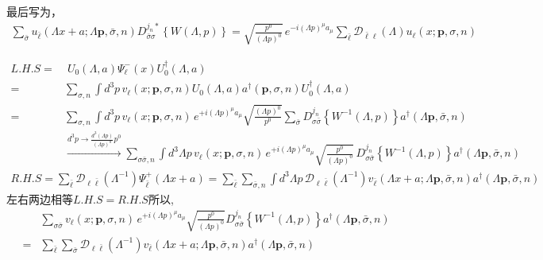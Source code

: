 最后写为，
\begin{equation}
    \begin{aligned}
            \sum_{\bar{\sigma}}u_{\bar{\ell}}(\Lambda x+a;\Lambda \boldsymbol{p},\bar{\sigma},n)D_{\bar{\sigma}\sigma }^{j_n*}\left\{W(\Lambda,p)\right\}=\sqrt{\frac{p^0}{(\Lambda p)^0}}\,e^{-i(\Lambda p)^\mu a_\mu}\sum_{\bar{\ell}}\mathscr{D}_{\bar{\ell}\ell}(\Lambda)u_{\ell}(x;\boldsymbol{p},\sigma,n)
    \end{aligned}
\end{equation}
\centerline{}
\[\begin{aligned}
    L.H.S=&\;U_0(\Lambda,a)\Psi^{-}_\ell(x)U_0^\dagger(\Lambda,a)\\
    =&\sum_{\sigma,n}\int d^3p\, v_{\ell}(x;\boldsymbol{p},\sigma,n) U_0(\Lambda,a)a^\dagger(\boldsymbol{p},\sigma,n)U_0^\dagger(\Lambda,a)\\
    =&\sum_{\sigma,n}\int d^3p\, v_{\ell}(x;\boldsymbol{p},\sigma,n)\,e^{+i(\Lambda p)^\mu a_\mu}\sqrt{\frac{(\Lambda p)^0}{p^0}}\sum_{\bar{\sigma}}D_{\sigma \bar{\sigma}}^{j_n}\left\{W^{-1}(\Lambda,p)\right\}a^\dagger(\Lambda\boldsymbol{p},\bar{\sigma},n)\\
    &\xrightarrow{d^3p\to \frac{d^3(\Lambda p)}{(\Lambda p)^0}p^0}\sum_{\sigma\bar{\sigma},n}\int d^3\Lambda p\, v_{\ell}(x;\boldsymbol{p},\sigma,n)\,e^{+i(\Lambda p)^\mu a_\mu}\sqrt{\frac{p^0}{(\Lambda p)^0}}\,D_{\sigma \bar{\sigma}}^{j_n}\left\{W^{-1}(\Lambda,p)\right\} a^\dagger(\Lambda\boldsymbol{p},\bar{\sigma},n)
\end{aligned}\]
\[\begin{aligned}
    R.H.S=\sum_{\bar{\ell}}\mathscr{D}_{\ell\bar{\ell}}(\Lambda^{-1})\Psi_{\bar{\ell}}^+(\Lambda x+a)
    =\sum_{\bar{\ell}}\sum_{\bar{\sigma},n}\int d^3\Lambda p\,\mathscr{D}_{\ell\bar{\ell}}(\Lambda^{-1}) v_{\bar{\ell}}(\Lambda x+a;\Lambda \boldsymbol{p},\bar{\sigma},n) a^\dagger(\Lambda \boldsymbol{p},\bar{\sigma},n)
\end{aligned}\]
左右两边相等$L.H.S=R.H.S$所以,
\[    \begin{aligned}
    &\sum_{\sigma\bar{\sigma}}v_{\ell}(x;\boldsymbol{p},\sigma,n)\,e^{+i(\Lambda p)^\mu a_\mu}\sqrt{\frac{p^0}{(\Lambda p)^0}}
    D_{\sigma \bar{\sigma}}^{j_n}\left\{W^{-1}(\Lambda,p)\right\}a^\dagger(\Lambda\boldsymbol{p},\bar{\sigma},n)
    \\=&\sum_{\bar{\ell}}\sum_{\bar{\sigma}}\mathscr{D}_{\ell\bar{\ell}}(\Lambda^{-1})v_{\bar{\ell}}(\Lambda x+a;\Lambda \boldsymbol{p},\bar{\sigma},n) a^\dagger(\Lambda \boldsymbol{p},\bar{\sigma},n)
\end{aligned}\]
